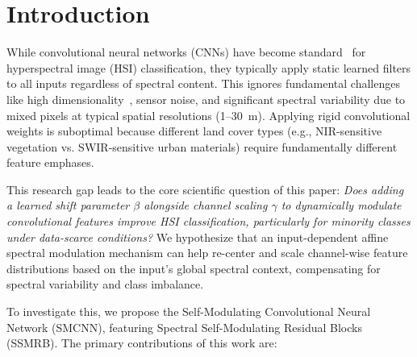 \documentclass[pdflatex,sn-mathphys-num]{sn-jnl}
\theoremstyle{thmstyleone}
\theoremstyle{thmstyletwo}
\theoremstyle{thmstylethree}
\begin{document}

\maketitle



\section{Introduction}

While convolutional neural networks (CNNs) have become standard~\cite{melgani2004classification} for hyperspectral image (HSI) classification, they typically apply static learned filters to all inputs regardless of spectral content. This ignores fundamental challenges like high dimensionality~\cite{hughes1968mean,xu2024deep,yang2024robust}, sensor noise, and significant spectral variability due to mixed pixels at typical spatial resolutions (1--30~m). Applying rigid convolutional weights is suboptimal because different land cover types (e.g., NIR-sensitive vegetation vs. SWIR-sensitive urban materials) require fundamentally different feature emphases.

This research gap leads to the core scientific question of this paper: \textit{Does adding a learned shift parameter $\beta$ alongside channel scaling $\gamma$ to dynamically modulate convolutional features improve HSI classification, particularly for minority classes under data-scarce conditions?} We hypothesize that an input-dependent affine spectral modulation mechanism can help re-center and scale channel-wise feature distributions based on the input's global spectral context, compensating for spectral variability and class imbalance.

To investigate this, we propose the Self-Modulating Convolutional Neural Network (SMCNN), featuring Spectral Self-Modulating Residual Blocks (SSMRB). The primary contributions of this work are:
\end{document}
